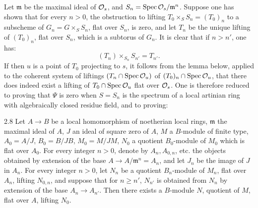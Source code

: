 Let $\mathfrak m$ be the maximal ideal of $\mathcal{O}_s$, and $S_n=\operatorname{Spec}\mathcal{O}_s/\mathfrak m^n$. Suppose one has shown that for every $n>0$, the obstruction to lifting $T_0\times_S S_n=(T_0)_n$ to a subscheme of $G_n=G\times_S S_n$, flat over $S_n$, is zero, and let $T_n$ be the unique lifting of $(T_0)_n$, flat over $S_n$, which is a subtorus of $G_n$. It is clear that if $n>n'$, one has:
\[
(T_n)\times_{S_n}S_{n'}=T_{n'}.
\]
If then $u$ is a point of $T_0$ projecting to $s$, it follows from the lemma below, applied to the coherent system of liftings $(T_n\cap\operatorname{Spec}\mathcal{O}_u)$ of $(T_0)_n\cap\operatorname{Spec}\mathcal{O}_u$, that there does indeed exist a lifting of $T_0\cap\operatorname{Spec}\mathcal{O}_u$ flat over $\mathcal{O}_s$. One is therefore reduced to proving that $\Psi$ is zero when $S=S_n$ is the spectrum of a local artinian ring with algebraically closed residue field, and to proving:
\begin{lemma}{2.8}\label{XV.2.8}
Let $A\to B$ be a local homomorphism of noetherian local rings, $\mathfrak m$ the maximal ideal of $A$, $J$ an ideal of square zero of $A$, $M$ a $B$-module of finite type, $A_0=A/J$, $B_0=B/JB$, $M_0=M/JM$, $N_0$ a quotient $B_0$-module of $M_0$ which is flat over $A_0$. For every integer $n>0$, denote by $A_n,A_{0,n}$, etc. the objects obtained by extension of the base $A\to A/\mathfrak m^n=A_n$, and let $J_n$ be the image of $J$ in $A_n$. For every integer $n>0$, let $N_n$ be a quotient $B_n$-module of $M_n$, flat over $A_n$, lifting $N_{0,n}$, and suppose that for $n\geq n'$, $N_{n'}$ is obtained from $N_n$ by extension of the base $A_n\to A_{n'}$. Then there exists a $B$-module $N$, quotient of $M$, flat over $A$, lifting $N_0$.
\end{lemma}
